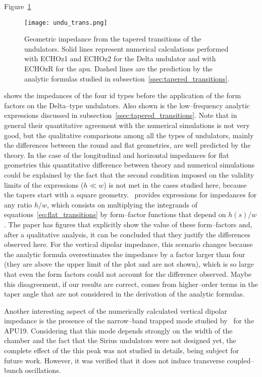     Figure~\ref{fig:undu_trans}
    \begin{figure}
        \centering
        \texttt{[image: undu\_trans.png]}
        \caption{Geometric impedance from the tapered transitions of the undulators. Solid lines represent numerical calculations performed with ECHOz1 and ECHOz2 for the Delta undulator and with ECHOzR for the \gls{apu}. Dashed lines are the prediction by the analytic formulas studied in subsection~\ref{ssec:tapered_transitions}.}
        \label{fig:undu_trans}
    \end{figure}
    shows the impedances of the four \gls{id} types before the application of the form factors on the Delta--type undulators. Also shown is the low--frequency analytic expressions discussed in subsection~\ref{ssec:tapered_transitions}. Note that in general their quantitative agreement with the numerical simulations is not very good, but the qualitative comparisons among all the types of undulators, mainly the differences between the round and flat geometries, are well predicted by the theory. In the case of the longitudinal and horizontal impedances for flat geometries this quantitative difference between theory and numerical simulations could be explained by the fact that the second condition imposed on the validity limits of the expressions ($h\ll w$) is not met in the cases studied here, because the tapers start with a square geometry.~ provides expressions for impedances for any ratio $h/w$, which consists on multiplying the integrands of equations~\eqref{eq:flat_transitions} by form--factor functions that depend on $h(s)/w$. The paper has figures that explicitly show the value of these form--factors and, after a qualitative analysis, it can be concluded that they justify the differences observed here. For the vertical dipolar impedance, this scenario changes because the analytic formula overestimates the impedance by a factor larger than four (they are above the upper limit of the plot and are not shown), which is so large that even the form factors could not account for the difference observed. Maybe this disagreement, if our results are correct, comes from higher--order terms in the taper angle that are not considered in the derivation of the analytic formulas.

    Another interesting aspect of the numerically calculated vertical dipolar impedance is the presence of the narrow--band trapped mode studied by~ for the APU19. Considering that this mode depends strongly on the width of the chamber and the fact that the Sirius undulators were not designed yet, the complete effect of the this peak was not studied in details, being subject for future work. However, it was verified that it does not induce transverse coupled--bunch oscillations.

